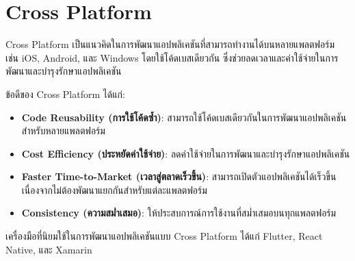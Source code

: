 \section{Cross Platform}
Cross Platform \cite{crossplatform} เป็นแนวคิดในการพัฒนาแอปพลิเคชันที่สามารถทำงานได้บนหลายแพลตฟอร์ม เช่น iOS, Android, และ Windows โดยใช้โค้ดเบสเดียวกัน ซึ่งช่วยลดเวลาและค่าใช้จ่ายในการพัฒนาและบำรุงรักษาแอปพลิเคชัน

ข้อดีของ Cross Platform ได้แก่:
\begin{itemize}
  \item \textbf{Code Reusability (การใช้โค้ดซ้ำ)}: สามารถใช้โค้ดเบสเดียวกันในการพัฒนาแอปพลิเคชันสำหรับหลายแพลตฟอร์ม
  \item \textbf{Cost Efficiency (ประหยัดค่าใช้จ่าย)}: ลดค่าใช้จ่ายในการพัฒนาและบำรุงรักษาแอปพลิเคชัน
  \item \textbf{Faster Time-to-Market (เวลาสู่ตลาดเร็วขึ้น)}: สามารถเปิดตัวแอปพลิเคชันได้เร็วขึ้นเนื่องจากไม่ต้องพัฒนาแยกกันสำหรับแต่ละแพลตฟอร์ม
  \item \textbf{Consistency (ความสม่ำเสมอ)}: ให้ประสบการณ์การใช้งานที่สม่ำเสมอบนทุกแพลตฟอร์ม
\end{itemize}

เครื่องมือที่นิยมใช้ในการพัฒนาแอปพลิเคชันแบบ Cross Platform ได้แก่ Flutter, React Native, และ Xamarin